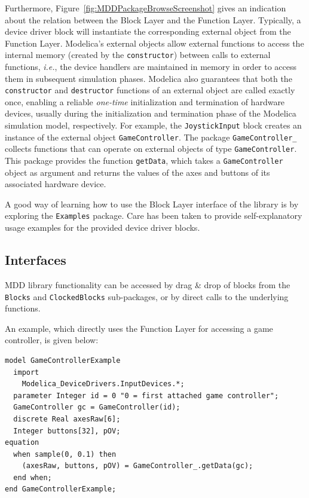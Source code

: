 \documentclass{resources/modelica}
\newcommand{\modelica}[1]{\lstinline[language=modelica]|#1|}
\begin{document}
\noindent
Furthermore, Figure~\ref{fig:MDDPackageBrowseScreenshot} gives an indication
about the relation between the \textsf{Block Layer} and the \textsf{Function Layer}. Typically, a
device driver block will instantiate the corresponding external object from the
\textsf{Function Layer}. Modelica's external objects allow external functions to access the internal memory (created by the \modelica{constructor}) between calls to external functions, \textit{i.e.}, the
device handlers are maintained in memory in order to access them in subsequent simulation phases.
Modelica also guarantees that both the \modelica{constructor} and \modelica{destructor} functions of
an external object are called exactly once, enabling a reliable \emph{one-time} initialization and termination of hard\-ware devices, usually during the initialization and termination phase of the Modelica simulation model, respectively.
For example, the \modelica{JoystickInput} block creates an instance of the
external object \mbox{\modelica{GameController}.} The package
\modelica{GameController_} collects functions that can operate on external
objects of type \mbox{\modelica{GameController}.} This package provides the function
\modelica{getData}, which takes a \modelica{GameController} object as
argument and returns the values of the axes and buttons of its associated
hardware device.

A good way of learning how to use the \textsf{Block Layer} interface of the library is by
exploring the \modelica{Examples} package. Care has been taken to provide
self-explanatory usage examples for the provided device driver blocks.

\subsection{Interfaces}

MDD library functionality can be accessed by drag \& drop of blocks
from the \modelica{Blocks} and \modelica{ClockedBlocks} sub-packages, or by
direct calls to the underlying functions.

An example, which directly uses the \textsf{Function Layer} for accessing a
game controller, is given below:
\begin{lstlisting}[language=modelica]
model GameControllerExample
  import
    Modelica_DeviceDrivers.InputDevices.*;
  parameter Integer id = 0 "0 = first attached game controller";
  GameController gc = GameController(id);
  discrete Real axesRaw[6];
  Integer buttons[32], pOV;
equation
  when sample(0, 0.1) then
    (axesRaw, buttons, pOV) = GameController_.getData(gc);
  end when;
end GameControllerExample;
\end{lstlisting}
\end{document}
